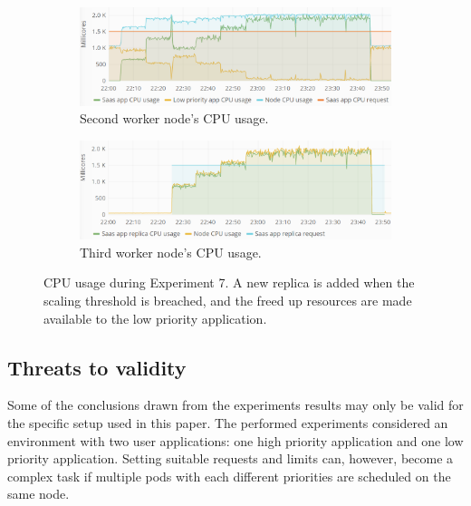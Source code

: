 %
%
\centering
\begin{figure}
\centering
\begin{subfigure}[b]{\columnwidth}
\centering
\includegraphics[width=0.75\columnwidth]{Images/Experiments/CPU/Grafana/cpu-saas-lpp-hpa-li-1.PNG}
\caption{Second worker node's CPU usage.}
\label{fig:cpu-saas-lpp-hpa-li-1}
\end{subfigure}
\hfill
\centering
\begin{subfigure}[b]{\columnwidth}
\centering
\includegraphics[width=0.75\columnwidth]{Images/Experiments/CPU/Grafana/cpu-saas-lpp-hpa-li-2.PNG}
\caption{Third worker node's CPU usage.}
\label{fig:cpu-saas-lpp-hpa-li-2}
\end{subfigure}
\hfill
\vspace*{-3mm}
\caption{CPU usage during Experiment 7. A new replica is added when the scaling threshold is breached, and the freed up resources are made available to the low priority application.}
\label{fig:cpu-saas-lpp-hpa-li}
\end{figure}

\subsection{Threats to validity}
Some of the conclusions drawn from the experiments results may only be valid for the specific setup used in this paper. The performed experiments considered an environment with two user applications: one high priority application and one low priority application. Setting suitable requests and limits can, however, become a complex task if multiple pods with each different priorities are scheduled on the same node.


